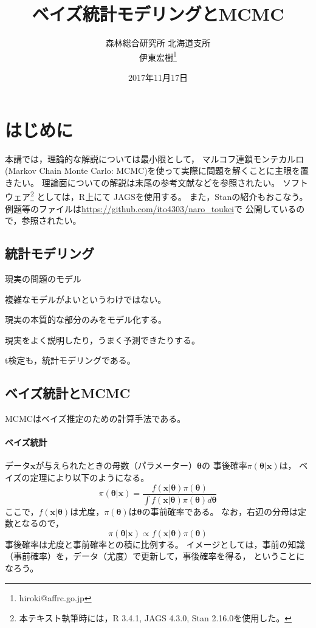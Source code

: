 \documentclass[11pt,uplatex]{jsarticle}
\begin{document}
\title{ベイズ統計モデリングとMCMC}
\author{森林総合研究所 北海道支所\\伊東宏樹\footnote{hiroki@affrc.go.jp}}
\date{2017年11月17日}
\maketitle


\section{はじめに}

本講では，理論的な解説については最小限として，
マルコフ連鎖モンテカルロ(Markov Chain Monte Carlo: MCMC)を使って実際に問題を解くことに主眼を置きたい。
理論面についての解説は末尾の参考文献などを参照されたい。
ソフトウェア\footnote{本テキスト執筆時には，R 3.4.1, JAGS 4.3.0, Stan 2.16.0を使用した。}
としては，\textsf{R}\cite{R}上にて
\textsf{JAGS}\cite{JAGS}を使用する。
また，\textsf{Stan}\cite{Stan}の紹介もおこなう。
例題等のファイルは\url{https://github.com/ito4303/naro_toukei}で
公開しているので，参照されたい。

\subsection{統計モデリング}

現実の問題のモデル

複雑なモデルがよいというわけではない。

現実の本質的な部分のみをモデル化する。

現実をよく説明したり，うまく予測できたりする。

t検定も，統計モデリングである。

\subsection{ベイズ統計とMCMC}

MCMCはベイズ推定のための計算手法である。

\paragraph{ベイズ統計}

データ$\bm{x}$が与えられたときの母数（パラメーター）$\bm{\theta}$の
事後確率$\pi(\bm{\theta}|\bm{x})$は，
ベイズの定理により以下のようになる。
\begin{equation}
\pi(\bm{\theta}|\bm{x}) = \frac{f(\bm{x}|\bm{\theta})\pi(\bm{\theta})}
{\int{f(\bm{x}|\bm{\theta})\pi(\bm{\theta})d\bm{\theta}}}\label{bayes1}
\end{equation}
ここで，$f(\bm{x}|\bm{\theta})$は尤度，$\pi(\bm{\theta})$は$\bm{\theta}$の事前確率である。
なお，右辺の分母は定数となるので，
\begin{equation}
\pi(\bm{\theta}|\bm{x}) \propto f(\bm{x}|\bm{\theta})\pi(\bm{\theta})\label{bayes2}
\end{equation}
事後確率は尤度と事前確率との積に比例する。
イメージとしては，事前の知識（事前確率）を，データ（尤度）で更新して，事後確率を得る，
ということになろう。
\end{document}
